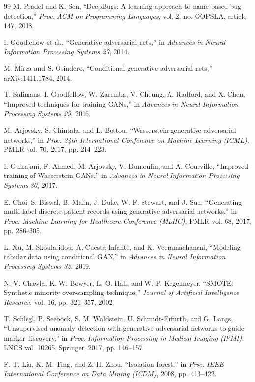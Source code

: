 \documentclass[12pt,a4paper]{article}
\begin{document}
\begin{thebibliography}{99}
M. Pradel and K. Sen,
``DeepBugs: A learning approach to name-based bug detection,''
\textit{Proc. ACM on Programming Languages}, vol. 2, no. OOPSLA, article 147, 2018.

I. Goodfellow et al.,
``Generative adversarial nets,''
in \textit{Advances in Neural Information Processing Systems 27}, 2014.

M. Mirza and S. Osindero,
``Conditional generative adversarial nets,''
arXiv:1411.1784, 2014.

T. Salimans, I. Goodfellow, W. Zaremba, V. Cheung, A. Radford, and X. Chen,
``Improved techniques for training GANs,''
in \textit{Advances in Neural Information Processing Systems 29}, 2016.

M. Arjovsky, S. Chintala, and L. Bottou,
``Wasserstein generative adversarial networks,''
in \textit{Proc. 34th International Conference on Machine Learning (ICML)}, PMLR vol. 70, 2017, pp. 214--223.

I. Gulrajani, F. Ahmed, M. Arjovsky, V. Dumoulin, and A. Courville,
``Improved training of Wasserstein GANs,''
in \textit{Advances in Neural Information Processing Systems 30}, 2017.

E. Choi, S. Biswal, B. Malin, J. Duke, W. F. Stewart, and J. Sun,
``Generating multi-label discrete patient records using generative adversarial networks,''
in \textit{Proc. Machine Learning for Healthcare Conference (MLHC)}, PMLR vol. 68, 2017, pp. 286--305.

L. Xu, M. Skoularidou, A. Cuesta-Infante, and K. Veeramachaneni,
``Modeling tabular data using conditional GAN,''
in \textit{Advances in Neural Information Processing Systems 32}, 2019.

N. V. Chawla, K. W. Bowyer, L. O. Hall, and W. P. Kegelmeyer,
``SMOTE: Synthetic minority over-sampling technique,''
\textit{Journal of Artificial Intelligence Research}, vol. 16, pp. 321--357, 2002.

T. Schlegl, P. Seeb\"ock, S. M. Waldstein, U. Schmidt-Erfurth, and G. Langs,
``Unsupervised anomaly detection with generative adversarial networks to guide marker discovery,''
in \textit{Proc. Information Processing in Medical Imaging (IPMI)}, LNCS vol. 10265, Springer, 2017, pp. 146--157.

F. T. Liu, K. M. Ting, and Z.-H. Zhou,
``Isolation forest,''
in \textit{Proc. IEEE International Conference on Data Mining (ICDM)}, 2008, pp. 413--422.


\end{thebibliography}
\end{document}
